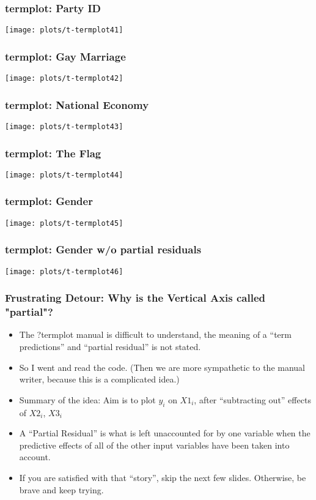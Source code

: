 \documentclass[10pt,english]{beamer}
\begin{document}
\begin{frame}[containsverbatim]
\frametitle{termplot: Party ID}


\texttt{[image: plots/t-termplot41]}

\end{frame}

\begin{frame}[containsverbatim]
\frametitle{termplot: Gay Marriage}


\texttt{[image: plots/t-termplot42]}

\end{frame}

\begin{frame}[containsverbatim]
\frametitle{termplot: National Economy}


\texttt{[image: plots/t-termplot43]}

\end{frame}

\begin{frame}[containsverbatim]
\frametitle{termplot: The Flag}


\texttt{[image: plots/t-termplot44]}

\end{frame}

\begin{frame}[containsverbatim]
\frametitle{termplot: Gender}


\texttt{[image: plots/t-termplot45]}

\end{frame}

\begin{frame}[containsverbatim]
\frametitle{termplot: Gender w/o partial residuals}


\texttt{[image: plots/t-termplot46]}

\end{frame}

\begin{frame}
\frametitle{Frustrating Detour: Why is the Vertical Axis called "partial"?}
\begin{itemize}
\item The ?termplot manual is difficult to understand, the meaning of a
``term predictions'' and ``partial residual'' is not stated. 
\item So I went and read the code. (Then we are more sympathetic to the
manual writer, because this is a complicated idea.)
\item Summary of the idea: Aim is to plot $y_{i}$ on $X1_{i}$, after ``subtracting
out'' effects of $X2_{i}$\textrm{, $X3{}_{i}$}
\item A ``Partial Residual'' is what is left unaccounted for by one variable
when the predictive effects of all of the other input variables have
been taken into account. 
\item If you are satisfied with that ``story'', skip the next few slides.
Otherwise, be brave and keep trying.
\end{itemize}
\end{frame}
\end{document}

